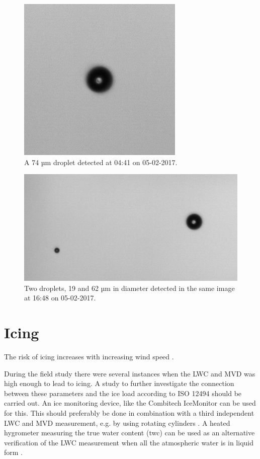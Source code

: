 \begin{figure}[ht]
  \centering
  \includegraphics[width=0.4\linewidth]{figures/170205_0441_droplet_74um}
\caption{A 74 µm droplet detected at 04:41 on 05-02-2017.}
\label{fig:170505_0441_droplet}
\end{figure}
\begin{figure}[ht]
  \centering
  \includegraphics[width=0.8\linewidth]{figures/170205_1648_droplet_19and62um}
\caption{Two droplets, 19 and 62 µm in diameter detected in the same image at 16:48 on 05-02-2017.}
\label{fig:170505_1648_droplet}
\end{figure}


\section{Icing}

The risk of icing increases with increasing wind speed \cite{makk2000}.

During the field study there were several instances when the LWC and MVD was high enough to lead to icing. A study to further investigate the connection between these parameters and the ice load according to ISO 12494 \cite{makk2014} should be carried out. An ice monitoring device, like the Combitech IceMonitor \cite{cost727,thors2015} can be used for this. This should preferably be done in combination with a third independent LWC and MVD measurement, e.g. by using rotating cylinders \cite{makk1992,knez2005}. A heated hygrometer measuring the true water content (\gls{twc}) can be used as an alternative verification of the LWC measurement when all the atmospheric water is in liquid form \cite{spie2012}.






